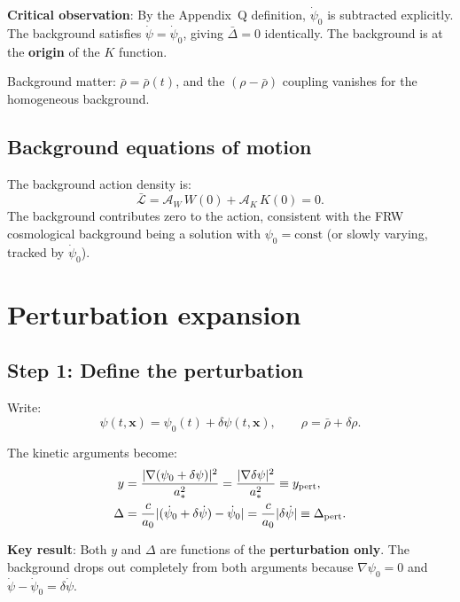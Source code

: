 \documentclass[aps,prd,twocolumn,nofootinbib]{revtex4-2}
\newcommand{\aM}{a_0}
\newcommand{\astar}{a_*}
\newcommand{\dpsi}{\delta\psi}
\begin{document}
\textbf{Critical observation}: By the Appendix~Q definition,
$\dot\psi_0$ is subtracted explicitly. The background satisfies
$\dot\psi = \dot\psi_0$, giving $\bar\Delta = 0$ identically.
The background is at the \textbf{origin} of the $K$ function.

Background matter: $\bar\rho = \bar\rho(t)$, and the $(\rho - \bar\rho)$
coupling vanishes for the homogeneous background.

\subsection{Background equations of motion}

The background action density is:
\begin{equation}
\bar{\mathcal{L}} = \mathcal{A}_W\,W(0) + \mathcal{A}_K\,K(0) = 0.
\end{equation}
The background contributes zero to the action, consistent with
the FRW cosmological background being a solution with
$\psi_0 = \text{const}$ (or slowly varying, tracked by $\dot\psi_0$).

\section{Perturbation expansion}
\label{sec:perturbation}

\subsection{Step 1: Define the perturbation}

Write:
\begin{equation}
\psi(t,\mathbf{x}) = \psi_0(t) + \dpsi(t,\mathbf{x}),
\qquad \rho = \bar\rho + \delta\rho.
\label{eq:pert-def}
\end{equation}

The kinetic arguments become:
\begin{align}
y &= \frac{|\nabla(\psi_0 + \dpsi)|^2}{\astar^2}
= \frac{|\nabla\dpsi|^2}{\astar^2}
\equiv y_{\rm pert}, \label{eq:y-pert}\\
\Delta &= \frac{c}{\aM}|(\dot\psi_0 + \delta\dot\psi) - \dot\psi_0|
= \frac{c}{\aM}|\delta\dot\psi|
\equiv \Delta_{\rm pert}. \label{eq:Delta-pert}
\end{align}

\textbf{Key result}: Both $y$ and $\Delta$ are functions of the
\textbf{perturbation only}. The background drops out completely
from both arguments because $\nabla\psi_0 = 0$ and
$\dot\psi - \dot\psi_0 = \delta\dot\psi$.
\end{document}
